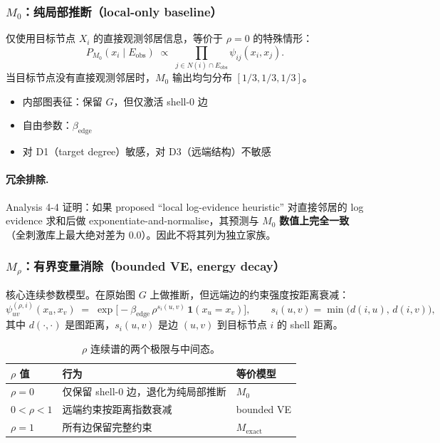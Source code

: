 \documentclass[11pt,a4paper]{ctexart}
\begin{document}
\subsubsection{$M_0$：纯局部推断（local-only baseline）}

仅使用目标节点 $X_i$ 的直接观测邻居信息，等价于 $\rho=0$ 的特殊情形：
\begin{equation}
\label{eq:M0}
P_{M_0}(x_i\mid E_\mathrm{obs})
\;\propto\;
\prod_{j\in N(i)\cap E_\mathrm{obs}} \psi_{ij}(x_i,x_j).
\end{equation}
当目标节点没有直接观测邻居时，$M_0$ 输出均匀分布 $[1/3,1/3,1/3]$。

\begin{itemize}
    \item 内部图表征：保留 $G$，但仅激活 shell-0 边
    \item 自由参数：$\beta_\mathrm{edge}$
    \item 对 D1（target degree）敏感，对 D3（远端结构）不敏感
\end{itemize}

\paragraph{冗余排除.}
Analysis 4-4 证明：如果 proposed ``local log-evidence heuristic'' 对直接邻居的 log evidence 求和后做 exponentiate-and-normalise，其预测与 $M_0$ \textbf{数值上完全一致}（全刺激库上最大绝对差为 0.0）。因此不将其列为独立家族。

\subsubsection{$M_\rho$：有界变量消除（bounded VE, energy decay）}

核心连续参数模型。在原始图 $G$ 上做推断，但远端边的约束强度按距离衰减：
\begin{equation}
\label{eq:rho}
\psi^{(\rho,i)}_{uv}(x_u,x_v)
\;=\;
\exp\!\bigl[-\beta_\mathrm{edge}\,\rho^{s_i(u,v)}\,\mathbf{1}(x_u=x_v)\bigr],
\qquad
s_i(u,v)=\min\bigl(d(i,u),\,d(i,v)\bigr),
\end{equation}
其中 $d(\cdot,\cdot)$ 是图距离，$s_i(u,v)$ 是边 $(u,v)$ 到目标节点 $i$ 的 shell 距离。

\begin{table}[H]
\centering\small
\begin{tabular}{lll}
\toprule
$\rho$ 值 & 行为 & 等价模型 \\
\midrule
$\rho=0$ & 仅保留 shell-0 边，退化为纯局部推断 & $M_0$ \\
$0<\rho<1$ & 远端约束按距离指数衰减 & bounded VE \\
$\rho=1$ & 所有边保留完整约束 & $M_\mathrm{exact}$ \\
\bottomrule
\end{tabular}
\caption{$\rho$ 连续谱的两个极限与中间态。}
\end{table}
\end{document}
